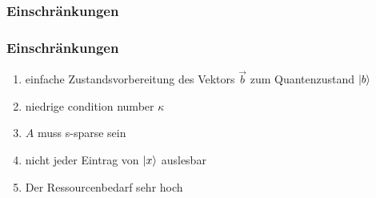 \subsubsection{Einschränkungen}
\begin{frame}
    \frametitle{Einschränkungen}
    \begin{enumerate}
        \item einfache Zustandsvorbereitung des Vektors $\vec b$ zum Quantenzustand $\ket{b}$

        \hfil

        \item niedrige condition number $\kappa$ 

        \hfil


        \item $A$ muss s-sparse sein

        \hfil


        \item nicht jeder Eintrag von $\ket{x}$ auslesbar

        \hfil


        \item Der Ressourcenbedarf sehr hoch


    \end{enumerate}

\end{frame}



